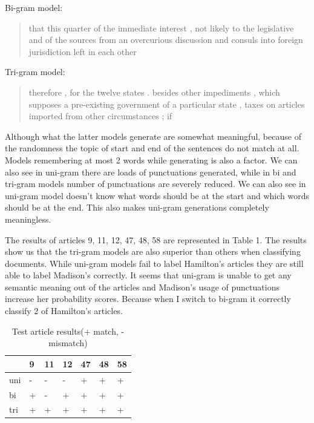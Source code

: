 \documentclass{article}
\begin{document}
Bi-gram model:
\begin{quote}
that this quarter of the immediate interest , not likely to the legislative and of the sources from an overcurious discussion and consuls into foreign jurisdiction left in each other
\end{quote}

Tri-gram model:
\begin{quote}
therefore , for the twelve states . besides other impediments , which supposes a pre-existing government of a particular state , taxes on articles imported from other circumstances ; if
\end{quote}
Although what the latter models generate are somewhat meaningful, because of the randomness the topic of start and  end of the sentences do not match at all. Models remembering at most 2 words while generating is also a factor. We can also see in uni-gram there are loads of punctuations generated, while in bi and tri-gram models number of punctuations are severely reduced. We can also see in uni-gram model doesn't know what words should be at the start and which words should be at the end. This also makes uni-gram generations completely meaningless.

The results of articles 9, 11, 12, 47, 48, 58 are represented in Table 1. The results show us that the tri-gram models are also superior than others when classifying documents. While uni-gram models fail to label Hamilton's articles they are still able to label Madison's correctly. It seems that uni-gram is unable to get any semantic meaning out of the articles and Madison's usage of punctuations increase her probability scores. Because when I switch to bi-gram it correctly classify 2 of Hamilton's articles.

\begin{table}[H]
\centering
\begin{tabular}{|l|llllll}
\hline
    & \multicolumn{1}{l|}{9} & \multicolumn{1}{l|}{11} & \multicolumn{1}{l|}{12} & \multicolumn{1}{l|}{47} & \multicolumn{1}{l|}{48} & \multicolumn{1}{l|}{58} \\ \hline
uni & -                      & -                       & -                       & +                       & +                       & +                       \\ \cline{1-1}
bi  & +                      & -                       & +                       & +                       & +                       & +                       \\ \cline{1-1}
tri & +                      & +                       & +                       & +                       & +                       & +                       \\ \cline{1-1}
\end{tabular}
\caption{Test article results(+ match, - mismatch)}
\end{table}
\end{document}
